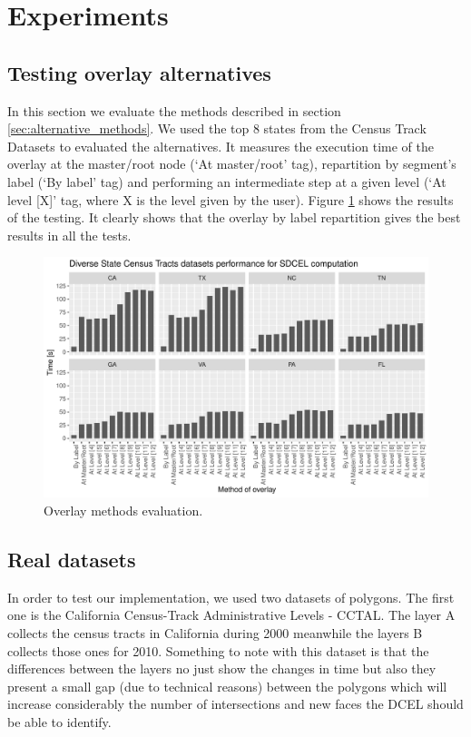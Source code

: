 \section{Experiments}

\subsection{Testing overlay alternatives}
In this section we evaluate the methods described in section \ref{sec:alternative_methods}.  We used the top 8 states from the Census Track Datasets to evaluated the alternatives.  It measures the execution time of the overlay at the master/root node (`At master/root' tag), repartition by segment's label (`By label' tag) and performing an intermediate step at a given level (`At level [X]' tag, where X is the level given by the user).  Figure \ref{fig:overlay_tester} shows the results of the testing.  It clearly shows that the overlay by label repartition gives the best results in all the tests.

\begin{figure}[!ht]
    \centering
    \includegraphics[width=\linewidth]{figures/experiments/Overlay_Tester}
    \caption{Overlay methods evaluation.}\label{fig:overlay_tester}
\end{figure}

\subsection{Real datasets}
In order to test our implementation, we used two datasets of polygons.  The first one is the California Census-Track Administrative Levels - CCTAL. The layer A collects the census tracts in California during 2000 meanwhile the layers B collects those ones for 2010.  Something to note with this dataset is that the differences between the layers no just show the changes in time but also they present a small gap (due to technical reasons) between the polygons which will increase considerably the number of intersections and new faces the DCEL should be able to identify.

